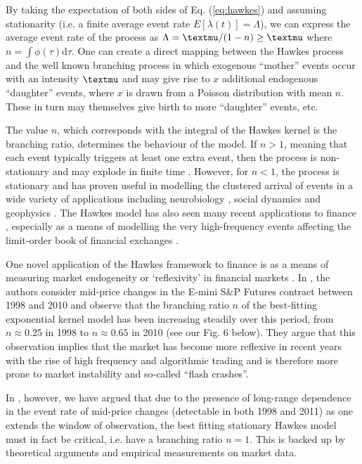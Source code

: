 \documentclass{article}
\begin{document}
By taking the expectation of both sides of Eq. (\ref{eq:hawkes}) and assuming
stationarity (i.e. a finite average event rate $E [\lambda (t)] = \Lambda$),
we can express the average event rate of the process as $\Lambda ={\textmu}/
(1 - n) \geq {\textmu}$ where $n = \int \phi (\tau) \mathrm{d } \tau$. One can
create a direct mapping between the Hawkes process and the well known
branching process {\cite{harris}} in which exogenous ``mother'' events occur
with an intensity ${\textmu}$ and may give rise to $x$ additional endogenous
``daughter'' events, where $x$ is drawn from a Poisson distribution with mean
$n$. These in turn may themselves give birth to more ``daughter'' events, etc.

The value $n$, which corresponds with the integral of the Hawkes kernel is the
branching ratio, determines the behaviour of the model. If $n > 1$, meaning
that each event typically triggers at least one extra event, then the process
is non-stationary and may explode in finite time
{\cite{commodityreflexivity}}. However, for $n < 1$, the process is stationary
and has proven useful in modelling the clustered arrival of events in a wide
variety of applications including neurobiology {\cite{neurobiology}}, social
dynamics {\cite{social,crime}} and geophysics
{\cite{earthquakes1,earthquakes2}}. The Hawkes model has also seen many recent
applications to finance {\cite{bauwens,hawkesvolatility,bormetti}}, especially
as a means of modelling the very high-frequency events affecting the
limit-order book of financial exchanges
{\cite{bacry,hawkesmicrostructure,bacrypricetrades,toke,dafonseca}}.

One novel application of the Hawkes framework to finance is as a means of
measuring market endogeneity or `reflexivity' in financial markets
{\cite{filimonov,commodityreflexivity}}. In {\cite{filimonov}}, the authors
consider mid-price changes in the E-mini S\&P Futures contract between 1998
and 2010 and observe that the branching ratio $n$ of the best-fitting
exponential kernel model has been increasing steadily over this period, from
$n \approx 0.25$ in 1998 to $n \approx 0.65$ in 2010 (see our Fig. 6 below).
They argue that this observation implies that the market has become more
reflexive in recent years with the rise of high frequency and algorithmic
trading and is therefore more prone to market instability and so-called
``flash crashes''.

In {\cite{criticalreflexivity}}, however, we have argued that due to the
presence of long-range dependence in the event rate of mid-price changes
(detectable in both 1998 and 2011) as one extends the window of observation,
the best fitting stationary Hawkes model must in fact be critical, i.e. have a
branching ratio $n = 1$. This is backed up by theoretical arguments and
empirical measurements on market data.
\end{document}
